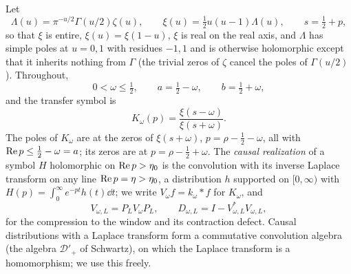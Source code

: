 Let
\begin{equation}\label{eq:xi-lambda}
 \Lambda(u)=\pi^{-u/2}\Gamma(u/2)\zeta(u),\qquad
 \xi(u)=\tfrac12u(u-1)\Lambda(u),\qquad s=\tfrac12+p,
\end{equation}
so that $\xi$ is entire, $\xi(u)=\xi(1-u)$, $\xi$ is real on the real axis, and
$\Lambda$ has simple poles at $u=0,1$ with residues $-1,1$ and is otherwise
holomorphic except that it inherits nothing from $\Gamma$ (the trivial zeros of
$\zeta$ cancel the poles of $\Gamma(u/2)$). Throughout,
\begin{equation}\label{eq:ab}
 0<\omega\leq\tfrac12,\qquad a=\tfrac12-\omega,\qquad b=\tfrac12+\omega,
\end{equation}
and the transfer symbol is
\begin{equation}\label{eq:symbol}
 K_\omega(p)=\frac{\xi(s-\omega)}{\xi(s+\omega)}.
\end{equation}
The poles of $K_\omega$ are at the zeros of $\xi(s+\omega)$, $p=\rho-\frac12-\omega$,
all with $\operatorname{Re} p\leq\frac12-\omega=a$; its zeros are at $p=\rho-\frac12+\omega$.
The \emph{causal realization} of a symbol $H$ holomorphic on $\operatorname{Re} p>\eta_0$ is
the convolution with its inverse Laplace transform on any line $\operatorname{Re} p=\eta>\eta_0$,
a distribution $h$ supported on $[0,\infty)$ with $H(p)=\int_0^\infty e^{-pt}h(t)\dd t$;
we write $V_\omega f=k_\omega*f$ for $K_\omega$, and
\begin{equation}\label{eq:compression}
 V_{\omega,L}=P_LV_\omega P_L,\qquad
 D_{\omega,L}=I-V_{\omega,L}^*V_{\omega,L},
\end{equation}
for the compression to the window and its contraction defect. Causal
distributions with a Laplace transform form a commutative convolution algebra
(the algebra $\mathcal D'_+$ of Schwartz), on which the Laplace transform is a
homomorphism; we use this freely.

